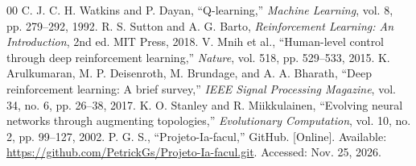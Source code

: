 \documentclass[conference]{IEEEtran}
\begin{document}
\begin{thebibliography}{00}
 C. J. C. H. Watkins and P. Dayan, ``Q-learning,'' \emph{Machine Learning}, vol. 8, pp. 279--292, 1992.
 R. S. Sutton and A. G. Barto, \emph{Reinforcement Learning: An Introduction}, 2nd ed. MIT Press, 2018.
 V. Mnih et al., ``Human-level control through deep reinforcement learning,'' \emph{Nature}, vol. 518, pp. 529--533, 2015.
 K. Arulkumaran, M. P. Deisenroth, M. Brundage, and A. A. Bharath, ``Deep reinforcement learning: A brief survey,'' \emph{IEEE Signal Processing Magazine}, vol. 34, no. 6, pp. 26--38, 2017.
 K. O. Stanley and R. Miikkulainen, ``Evolving neural networks through augmenting topologies,'' \emph{Evolutionary Computation}, vol. 10, no. 2, pp. 99--127, 2002.
 P. G. S., ``Projeto-Ia-facul,'' GitHub. [Online]. Available: \url{https://github.com/PetrickGs/Projeto-Ia-facul.git}. Accessed: Nov. 25, 2026.
\end{thebibliography}
\end{document}
